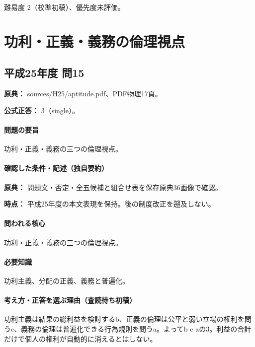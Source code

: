 \par 難易度 2（校準初稿）、優先度未評価。

\section{功利・正義・義務の倫理視点}

\subsection{平成25年度 問15}
\label{q:h25-reg-apt-15}

\noindent\textbf{原典：} sources/H25/aptitude.pdf、PDF物理17頁。

\textbf{公式正答：} 3（single）。

\paragraph{問題の要旨} 功利・正義・義務の三つの倫理視点。

\paragraph{確認した条件・記述（独自要約）}\mbox{}\par

\noindent\textbf{原典：} 問題文・否定・全五候補と組合せ表を保存原典36画像で確認。\par

\noindent\textbf{時点：} 平成25年度の本文表現を保持。後の制度改正を遡及しない。\par

\paragraph{問われる核心} 功利・正義・義務の三つの倫理視点。

\paragraph{必要知識} 功利主義、分配の正義、義務と普遍化。

\paragraph{考え方・正答を選ぶ理由（査読待ち初稿）} 功利主義は結果の総利益を検討するb、正義の倫理は公平と弱い立場の権利を問うc、義務の倫理は普遍化できる行為規則を問うa。よってb c aの3。利益の合計だけで個人の権利が自動的に消えるとはしない。

